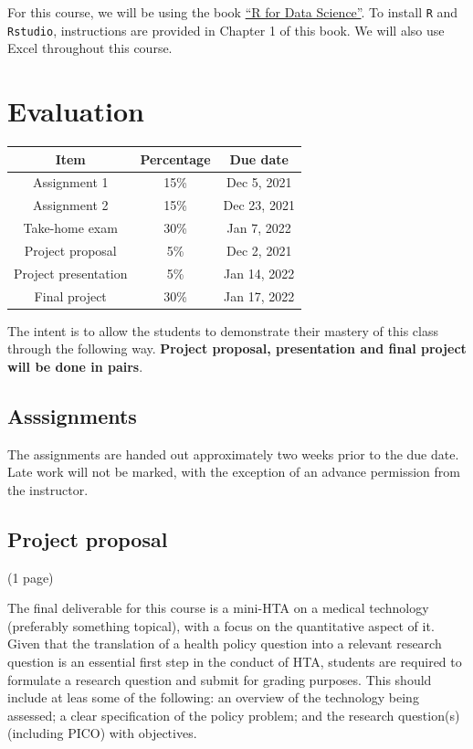 \documentclass[
]{book}
\begin{document}
For this course, we will be using the book \href{https://r4ds.had.co.nz/}{``R for Data Science''}. To install \texttt{R} and \texttt{Rstudio}, instructions are provided in Chapter 1 of this book. We will also use Excel throughout this course.

\hypertarget{evaluation}{%
\section*{Evaluation}\label{evaluation}}

\begin{longtable}[]{@{}ccc@{}}
\toprule
Item & Percentage & Due date \\
\midrule
\endhead
Assignment 1 & 15\% & Dec 5, 2021 \\
Assignment 2 & 15\% & Dec 23, 2021 \\
Take-home exam & 30\% & Jan 7, 2022 \\
Project proposal & 5\% & Dec 2, 2021 \\
Project presentation & 5\% & Jan 14, 2022 \\
Final project & 30\% & Jan 17, 2022 \\
\bottomrule
\end{longtable}

The intent is to allow the students to demonstrate their mastery of this class through the following way. \textbf{Project proposal, presentation and final project will be done in pairs}.

\hypertarget{asssignments}{%
\subsection*{Asssignments}\label{asssignments}}

The assignments are handed out approximately two weeks prior to the due date. Late work will not be marked, with the exception of an advance permission from the instructor.

\hypertarget{project-proposal}{%
\subsection*{Project proposal}\label{project-proposal}}

(1 page)

The final deliverable for this course is a mini-HTA on a medical technology (preferably something topical), with a focus on the quantitative aspect of it. Given that the translation of a health policy question into a relevant research question is an essential first step in the conduct of HTA, students are required to formulate a research question and submit for grading purposes. This should include at leas some of the following: an overview of the technology being assessed; a clear specification of the policy problem; and the research question(s) (including PICO) with objectives.
\end{document}
